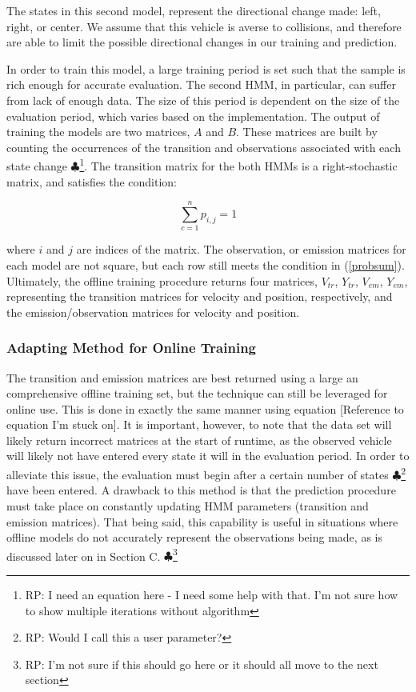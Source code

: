 \documentclass[conference]{IEEEtran}
\newcommand\RP[1]{$\clubsuit$\footnote{RP: #1}}
\begin{document}
The states in this second model, represent the directional change made: left, right, or center. We assume that this vehicle is averse to collisions, and therefore are able to limit the possible directional changes in our training and prediction.

In order to train this model, a large training period is set such that the sample is rich enough for accurate evaluation. The second HMM, in particular, can suffer from lack of enough data. The size of this period is dependent on the size of the evaluation period, which varies based on the implementation. The output of training the models are two matrices, $A$ and $B$. These matrices are built by counting the occurrences of the transition and observations associated with each state change \RP{I need an equation here - I need some help with that. I'm not sure how to show multiple iterations without algorithm}. The transition matrix for the both HMMs is a right-stochastic matrix, and satisfies the condition:

\begin{equation} \label{probsum}
    \sum_{c=1}^{n}p_{i,j} = 1
\end{equation}

where $i$ and $j$ are indices of the matrix. The observation, or emission matrices for each model are not square, but each row still meets the condition in (\ref{probsum}). Ultimately, the offline training procedure returns four matrices, $V_{tr}$, $Y_{tr}$, $V_{em}$, $Y_{em}$, representing the transition matrices for velocity and position, respectively, and the emission/observation matrices for velocity and position.



\subsubsection{Adapting Method for Online Training}
The transition and emission matrices are best returned using a large an comprehensive offline training set, but the technique can still be leveraged for online use. This is done in exactly the same manner using equation [Reference to equation I'm stuck on]. It is important, however, to note that the data set will likely return incorrect matrices at the start of runtime, as the observed vehicle will likely not have entered every state it will in the evaluation period. In order to alleviate this issue, the evaluation must begin after a certain number of states \RP{Would I call this a user parameter?} have been entered. A drawback to this method is that the prediction procedure must take place on constantly updating HMM parameters (transition and emission matrices). That being said, this capability is useful in situations where offline models do not accurately represent the observations being made, as is discussed later on in Section C. \RP{I'm not sure if this should go here or it should all move to the next section}
\end{document}
